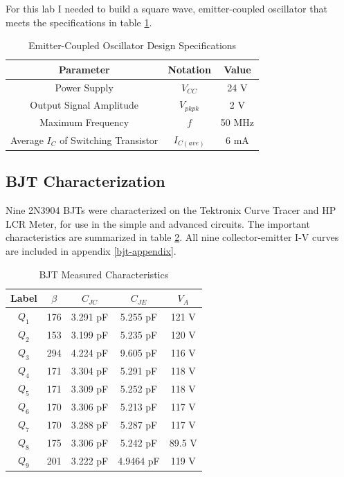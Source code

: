 \documentclass[titlepage, letterpaper, 10.5pt]{article}
\begin{document}
For this lab I needed to build a square wave, emitter-coupled oscillator
that meets the specifications in table \ref{specs-table}.

\begin{table}[ht]
\centering
\caption{Emitter-Coupled Oscillator Design Specifications}
\begin{tabular}{c | c | c}
\hline\hline
Parameter	&Notation	&Value	\\
\hline\hline
Power Supply	&$V_{CC}$	&24 V	\\
Output Signal Amplitude	&$V_{pkpk}$	&2 V	\\
Maximum Frequency	&$f$	&50 MHz	\\
Average $I_{C}$ of Switching Transistor	&$I_{C(ave)}$	&6 mA	\\
\hline\hline
\end{tabular}
\label{specs-table}
\end{table}

\subsection{BJT Characterization}

Nine 2N3904 BJTs were characterized on the Tektronix Curve Tracer and HP LCR Meter,
for use in the simple and advanced circuits. The important
characteristics are summarized in table \ref{bjt-characteristics-table}.
All nine collector-emitter I-V curves are included in appendix
\ref{bjt-appendix}.

\begin{table}[ht]
\centering
\caption{BJT Measured Characteristics}
\begin{tabular}{c | c | c | c | c}
\hline\hline
Label	&$\beta$	&$C_{JC}$	&$C_{JE}$	&$V_{A}$	\\
\hline\hline
$Q_{1}$	&176	&3.291 pF	&5.255 pF	&121 V	\\
$Q_{2}$	&153	&3.199 pF	&5.235 pF	&120 V	\\
$Q_{3}$	&294	&4.224 pF	&9.605 pF	&116 V	\\
$Q_{4}$	&171	&3.304 pF	&5.291 pF	&118 V	\\
$Q_{5}$	&171	&3.309 pF	&5.252 pF	&118 V	\\
$Q_{6}$	&170	&3.306 pF	&5.213 pF	&117 V	\\
$Q_{7}$	&170	&3.288 pF	&5.287 pF	&117 V	\\
$Q_{8}$	&175	&3.306 pF	&5.242 pF	&89.5 V	\\
$Q_{9}$	&201	&3.222 pF	&4.9464 pF	&119 V	\\
\hline\hline
\end{tabular}
\label{bjt-characteristics-table}
\end{table}
\end{document}
